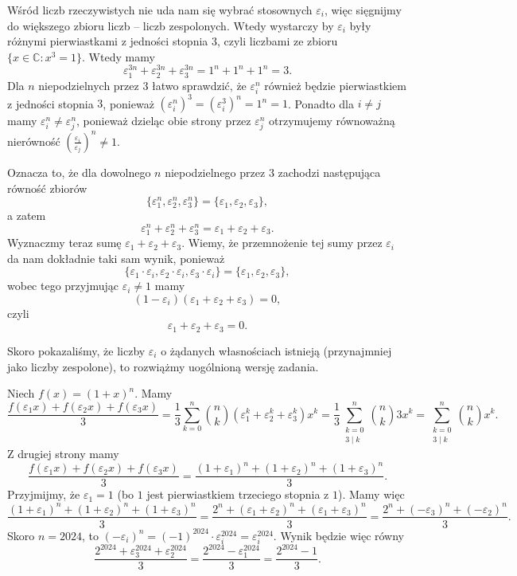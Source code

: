 \documentclass[shortabstract]{imthesis}
\begin{document}
Wśród liczb rzeczywistych nie uda nam się wybrać stosownych $\varepsilon_i$, więc sięgnijmy do większego zbioru liczb -- liczb zespolonych. Wtedy wystarczy by $\varepsilon_i$ były różnymi pierwiastkami z jedności stopnia $3$, czyli liczbami ze zbioru $\{x \in \mathbb{C} : x^3 = 1\}$. Wtedy mamy
$$
\varepsilon_1^{3n} + \varepsilon_2^{3n} + \varepsilon_3^{3n} = 1^n + 1^n + 1^n = 3.
$$
Dla $n$ niepodzielnych przez $3$ łatwo sprawdzić, że $\varepsilon_i^n$ również będzie pierwiastkiem z jedności stopnia $3$, ponieważ $(\varepsilon_i^n)^3 = (\varepsilon_i^3)^n = 1^n = 1$. Ponadto dla $i \neq j$ mamy $\varepsilon_i^n \neq \varepsilon_j^n$, ponieważ dzieląc obie strony przez $\varepsilon_j^n$ otrzymujemy równoważną nierówność $\left(\frac{\varepsilon_i}{\varepsilon_j}\right)^n \neq 1$.

Oznacza to, że dla dowolnego $n$ niepodzielnego przez $3$ zachodzi następująca równość zbiorów
$$
\{\varepsilon_1^{n}, \varepsilon_2^{n}, \varepsilon_3^{n}\} = \{\varepsilon_1, \varepsilon_2, \varepsilon_3\},
$$
a zatem
$$
\varepsilon_1^{n} + \varepsilon_2^{n} + \varepsilon_3^{n} = \varepsilon_1 + \varepsilon_2 + \varepsilon_3.
$$
Wyznaczmy teraz sumę $\varepsilon_1 + \varepsilon_2 + \varepsilon_3$. Wiemy, że przemnożenie tej sumy przez $\varepsilon_i$ da nam dokładnie taki sam wynik, ponieważ
$$
\{\varepsilon_1 \cdot \varepsilon_i, \varepsilon_2 \cdot \varepsilon_i, \varepsilon_3 \cdot \varepsilon_i\} = \{\varepsilon_1, \varepsilon_2, \varepsilon_3\},
$$
wobec tego przyjmując $\varepsilon_i \neq 1$ mamy
$$
(1-\varepsilon_i)(\varepsilon_1 + \varepsilon_2 + \varepsilon_3) = 0,
$$
czyli
$$
\varepsilon_1 + \varepsilon_2 + \varepsilon_3 = 0.
$$

Skoro pokazaliśmy, że liczby $\varepsilon_i$ o żądanych własnościach istnieją (przynajmniej jako liczby zespolone), to rozwiążmy uogólnioną wersję zadania.

Niech $f(x) = (1+x)^n$. Mamy
$$
\frac{f(\varepsilon_1x) + f(\varepsilon_2x) + f(\varepsilon_3x)}{3} = \frac13\sum_{k=0}^n {n \choose k} \left(\varepsilon_1^{k} + \varepsilon_2^{k} + \varepsilon_3^{k}\right) x^k = \frac13\sum_{\substack{k=0 \\ 3 \mid k}}^n {n \choose k} 3 x^k = \sum_{\substack{k=0 \\ 3 \mid k}}^n {n \choose k} x^k.
$$
Z drugiej strony mamy
$$
\frac{f(\varepsilon_1x) + f(\varepsilon_2x) + f(\varepsilon_3x)}{3} = \frac{(1+\varepsilon_1)^n + (1+\varepsilon_2)^n + (1+\varepsilon_3)^n}{3}.
$$
Przyjmijmy, że $\varepsilon_1 = 1$ (bo $1$ jest pierwiastkiem trzeciego stopnia z $1$). Mamy więc
$$
\frac{(1+\varepsilon_1)^n + (1+\varepsilon_2)^n + (1+\varepsilon_3)^n}{3} = \frac{2^n + (\varepsilon_1 + \varepsilon_2)^n + (\varepsilon_1 + \varepsilon_3)^n}{3} = \frac{2^n + (-\varepsilon_3)^n + (-\varepsilon_2)^n}{3}.
$$
Skoro $n = 2024$, to $(-\varepsilon_i)^n = (-1)^{2024} \cdot \varepsilon_i^{2024} = \varepsilon_i^{2024}$. Wynik będzie więc równy
$$
\frac{2^{2024} + \varepsilon_3^{2024} + \varepsilon_2^{2024}}{3} = \frac{2^{2024} - \varepsilon_1^{2024}}{3} = \frac{2^{2024}-1}{3}.
$$
\end{document}
